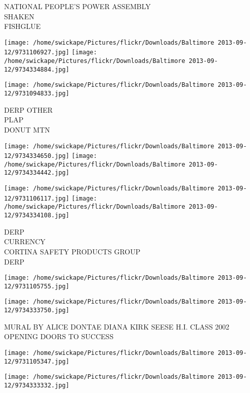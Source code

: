 \documentclass[10pt,letterpaper]{article}
\begin{document}
NATIONAL PEOPLE'S POWER ASSEMBLY\\
SHAKEN\\
FISHGLUE\\
\pagebreak

\texttt{[image: /home/swickape/Pictures/flickr/Downloads/Baltimore 2013-09-12/9731106927.jpg]}
\texttt{[image: /home/swickape/Pictures/flickr/Downloads/Baltimore 2013-09-12/9734334884.jpg]}

\vspace{0.25in}
\texttt{[image: /home/swickape/Pictures/flickr/Downloads/Baltimore 2013-09-12/9731094833.jpg]}

DERP OTHER\\
PLAP\\
DONUT MTN\\
\pagebreak

\texttt{[image: /home/swickape/Pictures/flickr/Downloads/Baltimore 2013-09-12/9734334650.jpg]}
\texttt{[image: /home/swickape/Pictures/flickr/Downloads/Baltimore 2013-09-12/9734334442.jpg]}

\texttt{[image: /home/swickape/Pictures/flickr/Downloads/Baltimore 2013-09-12/9731106117.jpg]}
\texttt{[image: /home/swickape/Pictures/flickr/Downloads/Baltimore 2013-09-12/9734334108.jpg]}

DERP\\
CURRENCY\\
CORTINA SAFETY PRODUCTS GROUP\\
DERP\\
\pagebreak

\texttt{[image: /home/swickape/Pictures/flickr/Downloads/Baltimore 2013-09-12/9731105755.jpg]}

\vspace{0.25in}
\texttt{[image: /home/swickape/Pictures/flickr/Downloads/Baltimore 2013-09-12/9734333750.jpg]}

MURAL BY ALICE DONTAE DIANA KIRK SEESE H.I. CLASS 2002\\
OPENING DOORS TO SUCCESS\\
\pagebreak

\texttt{[image: /home/swickape/Pictures/flickr/Downloads/Baltimore 2013-09-12/9731105347.jpg]}

\vspace{0.25in}
\texttt{[image: /home/swickape/Pictures/flickr/Downloads/Baltimore 2013-09-12/9734333332.jpg]}
\end{document}
